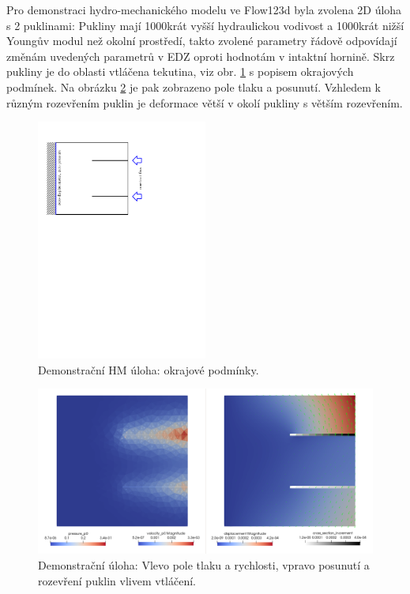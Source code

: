 \documentclass[11pt,a4paper]{article}
\begin{document}
\begin{onehalfspacing}
Pro demonstraci hydro-mechanického modelu ve Flow123d byla zvolena 2D úloha s 2 puklinami:
Pukliny mají 1000krát vyšší hydraulickou vodivost a 1000krát nižší Youngův modul než okolní prostředí, takto zvolené parametry řádově odpovídají změnám uvedených parametrů v EDZ oproti hodnotám v intaktní hornině.
Skrz pukliny je do oblasti vtláčena tekutina, viz obr. \ref{fig:hm_bc} s popisem okrajových podmínek.
Na obrázku \ref{fig:hm_results} je pak zobrazeno pole tlaku a posunutí.
Vzhledem k různým rozevřením puklin je deformace větší v okolí pukliny s větším rozevřením.
\begin{figure}
    \centering
    \includegraphics[width=0.5\textwidth]{graphics/obr_stebel/01_inject_bc.pdf}
    \caption{Demonstrační HM úloha: okrajové podmínky.}
    \label{fig:hm_bc}
\end{figure}

\begin{figure}
    \centering
    \includegraphics[width=\textwidth]{graphics/obr_stebel/01_inject.png}
    \caption{Demonstrační úloha: Vlevo pole tlaku a rychlosti, vpravo posunutí a rozevření puklin vlivem vtláčení.}
    \label{fig:hm_results}
\end{figure}



\end{onehalfspacing}
\end{document}
